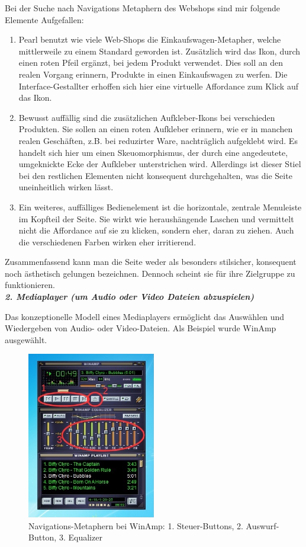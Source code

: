 \documentclass[a4paper,10pt]{article}
\begin{document}
Bei der Suche nach Navigations Metaphern des Webshops sind mir folgende Elemente Aufgefallen:\newline
\begin{enumerate}
\item Pearl benutzt wie viele Web-Shops die Einkaufswagen-Metapher, welche mittlerweile zu einem Standard geworden ist. Zusätzlich wird das Ikon, durch einen roten Pfeil ergänzt, bei jedem Produkt verwendet. Dies soll an den realen Vorgang erinnern, Produkte in einen Einkaufswagen zu werfen. Die Interface-Gestallter erhoffen sich hier eine virtuelle Affordance zum Klick auf das Ikon.
\item Bewusst auffällig sind die zusätzlichen Aufkleber-Ikons bei verschieden Produkten. Sie sollen an einen roten Aufkleber erinnern, wie er in manchen realen Geschäften, z.B. bei reduzirter Ware, nachträglich aufgeklebt wird. Es handelt sich hier um einen Skeuomorphismus, der durch eine angedeutete, umgeknickte Ecke der Aufkleber unterstrichen wird. Allerdings ist dieser Stiel bei den restlichen Elementen nicht konsequent durchgehalten, was die Seite uneinheitlich wirken lässt.
\item Ein weiteres, auffälliges Bedienelement ist die horizontale, zentrale Menuleiste im Kopfteil der Seite. Sie wirkt wie heraushängende Laschen und vermittelt nicht die Affordance auf sie zu klicken, sondern eher, daran zu ziehen. Auch die verschiedenen Farben wirken eher irritierend.
\end{enumerate}

Zusammenfassend kann man die Seite weder als besonders stilsicher, konsequent noch ästhetisch gelungen bezeichnen. Dennoch scheint sie für ihre Zielgruppe zu funktionieren.\\

\textbf{\textit{2. Mediaplayer (um Audio oder Video Dateien abzuspielen)}} \newline

Das konzeptionelle Modell eines Mediaplayers ermöglicht das Auswählen und Wiedergeben von Audio- oder Video-Dateien.
Als Beispiel wurde WinAmp ausgewählt.

\begin{figure}[ht]
\centering \includegraphics[width=0.5\textwidth]{winamp.jpg}
\caption{Navigations-Metaphern bei WinAmp: 1. Steuer-Buttons, 2. Auswurf-Button, 3. Equalizer}
\end{figure}
\end{document}

